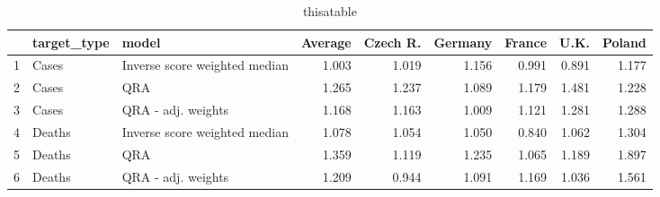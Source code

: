 \newpage

\begin{table}[h]
\centering
\begin{tabular}{rllrrrrrr}
  \hline
 & target\_type & model & Average & Czech R. & Germany & France & U.K. & Poland \\ 
  \hline
1 & Cases & Inverse score weighted median & 1.003 & 1.019 & 1.156 & 0.991 & 0.891 & 1.177 \\ 
  2 & Cases & QRA & 1.265 & 1.237 & 1.089 & 1.179 & 1.481 & 1.228 \\ 
  3 & Cases & QRA - adj. weights & 1.168 & 1.163 & 1.009 & 1.121 & 1.281 & 1.288 \\ 
  4 & Deaths & Inverse score weighted median & 1.078 & 1.054 & 1.050 & 0.840 & 1.062 & 1.304 \\ 
  5 & Deaths & QRA & 1.359 & 1.119 & 1.235 & 1.065 & 1.189 & 1.897 \\ 
  6 & Deaths & QRA - adj. weights & 1.209 & 0.944 & 1.091 & 1.169 & 1.036 & 1.561 \\ 
   \hline
\end{tabular}
\caption{thisatable}
\label{tab:modeltype_ens_withall}
\end{table}



